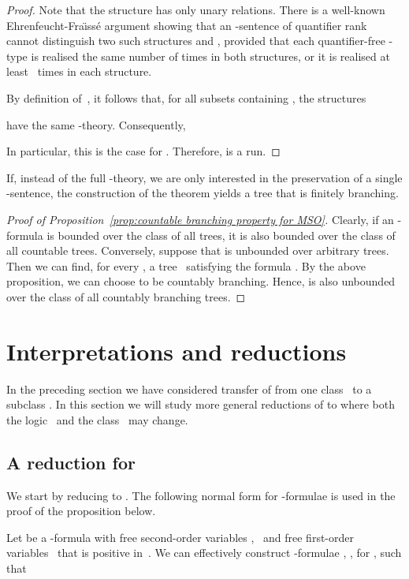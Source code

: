 \documentclass{LMCS}
\begin{document}
\begin{thm}
\begin{proof}
Note that the structure  has only unary relations.
There is a well-known Ehrenfeucht-Fra\"\i ss\'e argument showing that
an -sentence of quantifier rank~ cannot distinguish
two such structures  and ,
provided that each quantifier-free -type is realised the same
number of times in both structures, or it is realised at least ~times
in each structure.

By definition of~, it follows that,
for all subsets  containing ,
the structures

have the same -theory.
Consequently,

In particular, this is the case for .
Therefore,  is a run.
\end{proof}
\begin{rem}
If, instead of the full -theory, we are only interested in
the preservation of a single -sentence,
the construction of the theorem yields a tree that is finitely branching.
\end{rem}

\begin{proof}[Proof of Proposition~\ref{prop:countable branching property for MSO}]
Clearly, if an -formula  is bounded over the class of all
trees, it is also bounded over the class of all countable trees.
Conversely, suppose that  is unbounded over arbitrary
trees. Then we can find, for every , a tree~
satisfying the formula
.
By the above proposition, we can choose  to be countably branching.
Hence,  is also unbounded over the class of all countably
branching trees.
\end{proof}

\section{Interpretations and reductions}
\label{sect:interpretations}

In the preceding section we have considered transfer of 
from one class~ to a subclass .
In this section we will study more general reductions
of  to  where both the logic~
and the class~ may change.

\subsection{\boldmath A reduction for }
\label{GFredsec}

We start by reducing  to .
The following normal form for -formulae is used in the proof
of the proposition below.
\begin{lem}\label{lem:normal form for GSOg}
Let  be a -formula with
free second-order variables ,~ and
free first-order variables~ that is positive in~.
We can effectively construct 
-formulae , , for ,
such that


\end{lem}
\end{thm}
\end{document}
